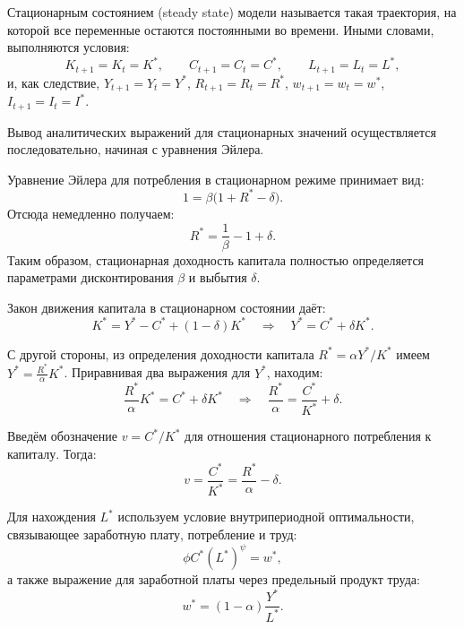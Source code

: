 \documentclass[12pt,a4paper]{report}   %
\begin{document}
            Стационарным состоянием (steady state) модели называется такая траектория, на которой все переменные остаются постоянными во времени. Иными словами, выполняются условия:
            \[
            K_{t+1}=K_t=K^*, \qquad 
            C_{t+1}=C_t=C^*, \qquad 
            L_{t+1}=L_t=L^*,
            \]
            и, как следствие, $Y_{t+1}=Y_t=Y^*$, $R_{t+1}=R_t=R^*$, $w_{t+1}=w_t=w^*$, $I_{t+1}=I_t=I^*$.

            Вывод аналитических выражений для стационарных значений осуществляется последовательно, начиная с уравнения Эйлера.


            Уравнение Эйлера для потребления в стационарном режиме принимает вид:
            \begin{equation}
            1 = \beta \bigl(1 + R^* - \delta\bigr).
            \end{equation}
            Отсюда немедленно получаем:
            \begin{equation}
            R^* = \frac{1}{\beta} - 1 + \delta. \tag{3.1}
            \end{equation}
            Таким образом, стационарная доходность капитала полностью определяется параметрами дисконтирования $\beta$ и выбытия $\delta$.


            Закон движения капитала в стационарном состоянии даёт:
            \[
            K^* = Y^* - C^* + (1-\delta)K^* \quad\Longrightarrow\quad Y^* = C^* + \delta K^*.
            \]

            С другой стороны, из определения доходности капитала $R^* = \alpha Y^*/K^*$ имеем $Y^* = \frac{R^*}{\alpha}K^*$. Приравнивая два выражения для $Y^*$, находим:
            \[
            \frac{R^*}{\alpha}K^* = C^* + \delta K^* \quad\Longrightarrow\quad 
            \frac{R^*}{\alpha} = \frac{C^*}{K^*} + \delta.
            \]

            Введём обозначение $v = C^*/K^*$ для отношения стационарного потребления к капиталу. Тогда:
            \begin{equation}
            v = \frac{C^*}{K^*} = \frac{R^*}{\alpha} - \delta. \tag{3.2}
            \end{equation}


            Для нахождения $L^*$ используем условие внутрипериодной оптимальности, связывающее заработную плату, потребление и труд:
            \[
            \phi C^* (L^*)^{\psi} = w^*,
            \]
            а также выражение для заработной платы через предельный продукт труда:
            \[
            w^* = (1-\alpha)\frac{Y^*}{L^*}.
            \]
\end{document}
